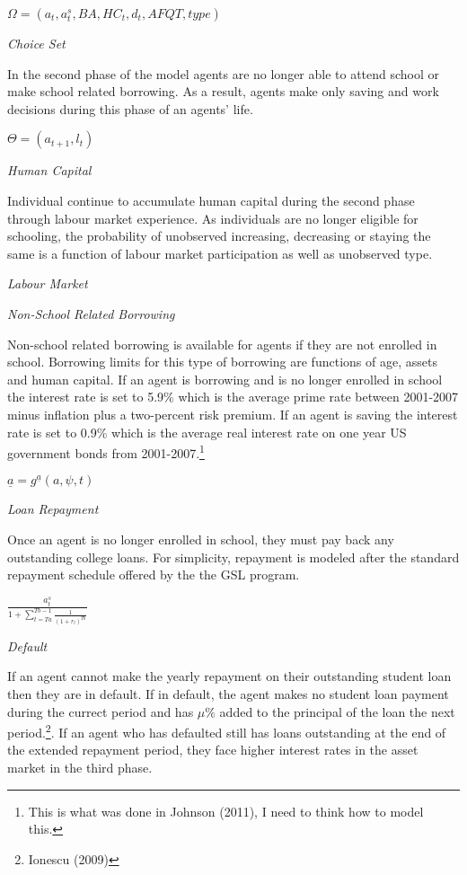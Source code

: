 \documentclass[letterpaper,12pt]{article}
\begin{document}
$\Omega = (a_t, a_t^s, BA, HC_t, d_t, AFQT, type)$

\noindent \emph{Choice Set}

In the second phase of the model agents are no longer able to attend school or make school related borrowing. As a result, agents make only saving and work decisions during this phase of an agents' life. 

$\Theta = (a_{t+1}, l_t)$

\noindent \emph{Human Capital}

Individual continue to accumulate human capital during the second phase through labour market experience. As individuals are no longer eligible for schooling, the probability of unobserved increasing, decreasing or staying the same is a function of labour market participation as well as unobserved type. 

\noindent \emph{Labour Market}

\noindent \emph{Non-School Related Borrowing}

Non-school related borrowing is available for agents if they are not enrolled in school. Borrowing limits for this type of borrowing are functions of age, assets and human capital. If an agent is borrowing and is no longer enrolled in school the interest rate is set to 5.9\% which is the average prime rate between 2001-2007 minus inflation plus a two-percent risk premium. If an agent is saving the interest rate is set to 0.9\% which is the average real interest rate on one year US government bonds from 2001-2007.\footnote{This is what was done in Johnson (2011), I need to think how to model this.} 

$\underline{a} = g^{\underline{a}}(a, \psi, t)$ 

\noindent \emph{Loan Repayment}

Once an agent is no longer enrolled in school, they must pay back any outstanding college loans. For simplicity, repayment is modeled after the standard repayment schedule offered by the the GSL program. 

$\frac{a^s_t}{1 + \sum_{t = Ta}^{Tb -1} \frac{1}{(1 + r_l)^{Tb}}}$

\noindent \emph{Default}

If an agent cannot make the yearly repayment on their outstanding student loan then they are in default. If in default, the agent makes no student loan payment during the currect period and has $\mu \%$ added to the principal of the loan the next period.\footnote{Ionescu (2009)}. If an agent who has defaulted still has loans outstanding at the end of the extended repayment period, they face higher interest rates in the asset market in the third phase. 
\end{document}

